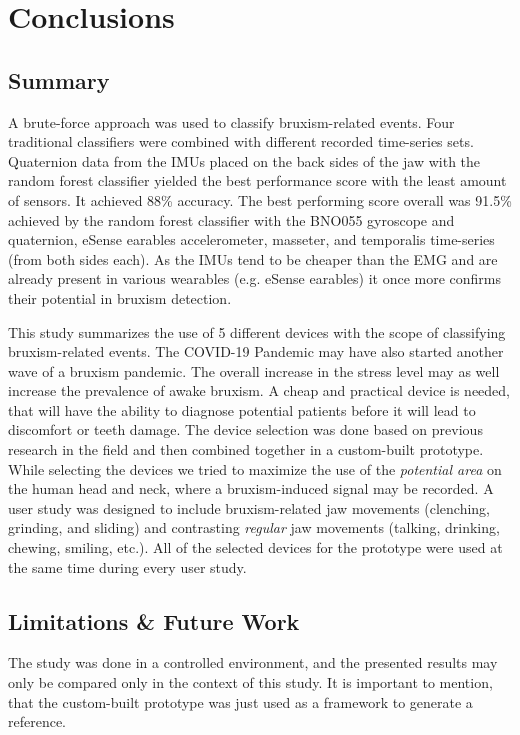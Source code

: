 \chapter{Conclusions}
\label{ch:conslucions}

\section{Summary}

A brute-force approach was used to classify bruxism-related events. Four traditional classifiers were combined with different recorded time-series sets. Quaternion data from the IMUs placed on the back sides of the jaw with the random forest classifier yielded the best performance score with the least amount of sensors. It achieved 88\% accuracy. The best performing score overall was 91.5\% achieved by the random forest classifier with the BNO055 gyroscope and quaternion, eSense earables accelerometer, masseter, and temporalis time-series (from both sides each). As the IMUs tend to be cheaper than the EMG and are already present in various wearables (e.g. eSense earables) it once more confirms their potential in bruxism detection.

This study summarizes the use of 5 different devices with the scope of classifying bruxism-related events. The COVID-19 Pandemic may have also started another wave of a bruxism pandemic. The overall increase in the stress level may as well increase the prevalence of awake bruxism. A cheap and practical device is needed, that will have the ability to diagnose potential patients before it will lead to discomfort or teeth damage. The device selection was done based on previous research in the field and then combined together in a custom-built prototype. While selecting the devices we tried to maximize the use of the \emph{potential area} on the human head and neck, where a bruxism-induced signal may be recorded. A user study was designed to include bruxism-related jaw movements (clenching, grinding, and sliding) and contrasting \emph{regular} jaw movements (talking, drinking, chewing, smiling, etc.). All of the selected devices for the prototype were used at the same time during every user study.

\section{Limitations \& Future Work}

The study was done in a controlled environment, and the presented results may only be compared only in the context of this study. It is important to mention, that the custom-built prototype was just used as a framework to generate a reference.

